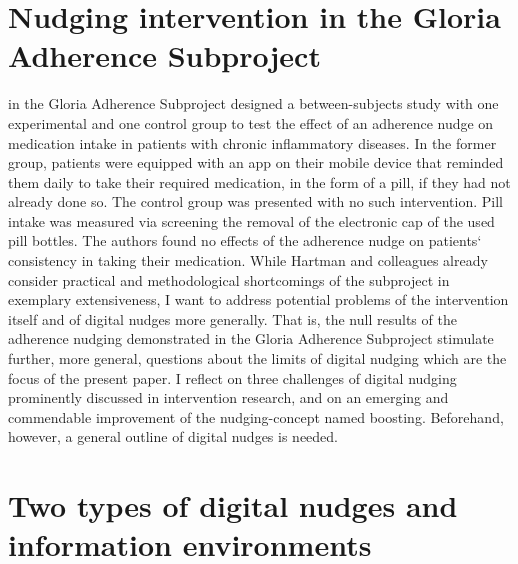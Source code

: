 \documentclass[reflection, authordate]{jote-new-article}
\begin{document}
\section{Nudging intervention in the Gloria Adherence Subproject}



\textcite{Hartman2021} in the Gloria Adherence Subproject designed a between-subjects study with one experimental and one control group to test the effect of an adherence nudge on medication intake in patients with chronic inflammatory diseases. In the former group, patients were equipped with an app on their mobile device that reminded them daily to take their required medication, in the form of a pill, if they had not already done so. The control group was presented with no such intervention. Pill intake was measured via screening the removal of the electronic cap of the used pill bottles. The authors found no effects of the adherence nudge on patients‘ consistency in taking their medication. While Hartman and colleagues already consider practical and methodological shortcomings of the subproject in exemplary extensiveness, I want to address potential problems of the intervention itself and of digital nudges more generally. That is, the null results of the adherence nudging demonstrated in the Gloria Adherence Subproject stimulate further, more general, questions about the limits of digital nudging which are the focus of the present paper. I reflect on three challenges of digital nudging prominently discussed in intervention research, and on an emerging and commendable improvement of the nudging-concept named boosting. Beforehand, however, a general outline of digital nudges is needed.



\section{Two types of digital nudges and information environments}
\end{document}
